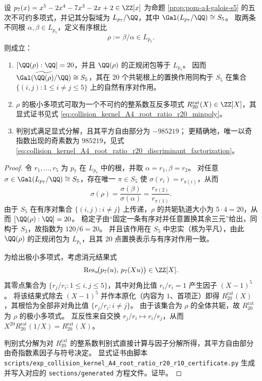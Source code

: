\begin{theorem}\label{thm:pom-p7-ordered-root-ratio-s5-ordered-pairs}
设 \(p_7(x)=x^5-2x^4-7x^3-2x+2\in\ZZ[x]\) 为命题 \ref{prop:pom-a4-galois-s5} 的五次不可约多项式，并记其分裂域为 \(L_{p_7}/\QQ\)，其中
\(\Gal(L_{p_7}/\QQ)\cong S_5\)。
取两条不同根 \(\alpha,\beta\in L_{p_7}\)，定义有序根比
\[
\rho:=\beta/\alpha\in L_{p_7}.
\]
则成立：
\begin{enumerate}
  \item \([\QQ(\rho):\QQ]=20\)，并且 \(\QQ(\rho)\) 的正规闭包等于 \(L_{p_7}\)。
  因而 \(\Gal(\widetilde{\QQ(\rho)}/\QQ)\cong S_5\)，其在 \(20\) 个共轭根上的置换作用同构于 \(S_5\) 在集合
  \(
  \{(i,j):1\le i\neq j\le 5\}
  \)
  上的自然有序对作用。
  \item \(\rho\) 的极小多项式可取为一个不可约的整系数互反多项式
  \(R_{20}^{\mathrm{rat}}(X)\in\ZZ[X]\)，其显式证书见式 \eqref{eq:collision_kernel_A4_root_ratio_r20_minpoly}。
  \item 判别式满足显式分解，且其平方自由部分为 \(-985219\)；
  更精确地，唯一以奇指数出现的奇素数为 \(985219\)，见式 \eqref{eq:collision_kernel_A4_root_ratio_r20_discriminant_factorization}。
\end{enumerate}
\end{theorem}




\begin{proof}
令 \(r_1,\dots,r_5\) 为 \(p_7\) 在 \(L_{p_7}\) 中的根，并取 \(\alpha=r_1,\beta=r_2\)。
对任意 \(\sigma\in\Gal(L_{p_7}/\QQ)\cong S_5\)，存在唯一 \(\pi\in S_5\) 使 \(\sigma(r_i)=r_{\pi(i)}\)，从而
\[
\sigma(\rho)=\frac{\sigma(\beta)}{\sigma(\alpha)}=\frac{r_{\pi(2)}}{r_{\pi(1)}}.
\]
由于 \(S_5\) 在有序对集合 \(\{(i,j):i\neq j\}\) 上传递，\(\rho\) 的共轭轨道大小为 \(5\cdot 4=20\)，从而
\([\QQ(\rho):\QQ]=20\)。
稳定子由“固定一条有序对并任意置换其余三元”给出，同构于 \(S_3\)，故指数为 \(120/6=20\)。
并且该作用在 \(S_5\) 中忠实（核为平凡），由此 \(\QQ(\rho)\) 的正规闭包为 \(L_{p_7}\)，且其 \(20\) 点置换表示与有序对作用一致。
\par
为给出极小多项式，考虑消元结果式
\[
\operatorname{Res}_{u}\!\bigl(p_7(u),\,p_7(Xu)\bigr)\in\ZZ[X].
\]
其零点集合为 \(\{r_j/r_i:1\le i,j\le 5\}\)，其中对角比值 \(r_i/r_i=1\) 产生因子 \((X-1)^5\)。
将该结果式除去 \((X-1)^5\) 并作本原化（内容为 \(1\)、首项正）即得 \(R_{20}^{\mathrm{rat}}(X)\)，其根恰为全部非对角比值 \(\{r_j/r_i:i\neq j\}\)。
由于该集合为 \(\rho\) 的全体共轭，故 \(R_{20}^{\mathrm{rat}}\) 为 \(\rho\) 的极小多项式。
互反性来自交换 \(r_j/r_i\mapsto r_i/r_j\)，从而
\(
X^{20}R_{20}^{\mathrm{rat}}(1/X)=R_{20}^{\mathrm{rat}}(X)
\)。
\par
判别式分解为对 \(R_{20}^{\mathrm{rat}}\) 的整系数判别式直接计算与因子分解所得，其平方自由部分由奇指数素因子与符号决定。
显式证书由脚本 \texttt{scripts/exp\_collision\_kernel\_A4\_root\_ratio\_r20\_r10\_certificate.py} 生成并写入对应的 \texttt{sections/generated} 方程文件。证毕。
\end{proof}

